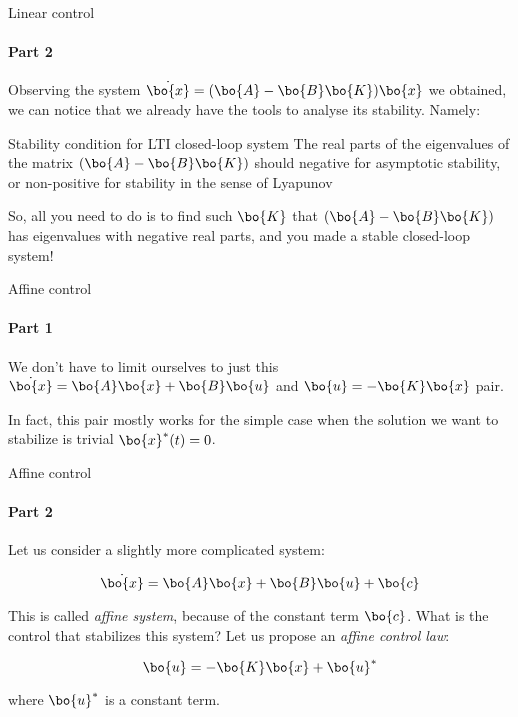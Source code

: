 \documentclass{beamer}
\begin{document}
\begin{frame}{Linear control}
\framesubtitle{Part 2}
\begin{flushleft}

Observing the system $\dot{\bo{x}} = (\bo{A} - \bo{B}\bo{K})\bo{x}$ we obtained, we can notice that we already have the tools to analyse its stability. Namely:

\begin{block}{Stability condition for LTI closed-loop system}
The real parts of the eigenvalues of the matrix $(\bo{A} - \bo{B}\bo{K})$ should negative for asymptotic stability, or non-positive for stability in the sense of Lyapunov
\end{block}


\bigskip

So, all you need to do is to find such $\bo{K}$ that $(\bo{A} - \bo{B}\bo{K})$ has eigenvalues with negative real parts, and you made a stable closed-loop system!

\end{flushleft}
\end{frame}




\begin{frame}{Affine control}
\framesubtitle{Part 1}
\begin{flushleft}

We don't have to limit ourselves to just this $\dot{\bo{x}} = \bo{A}\bo{x} + \bo{B}\bo{u}$ and $\bo{u} = -\bo{K}\bo{x}$ pair. 

\bigskip

In fact, this pair mostly works for the simple case when the solution we want to stabilize is trivial $\bo{x}^*(t) = 0$.


\end{flushleft}
\end{frame}



\begin{frame}{Affine control}
\framesubtitle{Part 2}
\begin{flushleft}

Let us consider a slightly more complicated system:

\begin{equation}
    \dot{\bo{x}} = \bo{A}\bo{x} + \bo{B}\bo{u} + \bo{c}
\end{equation}

This is called \emph{affine system}, because of the constant term $\bo{c}$. What is the control that stabilizes this system? Let us propose an \emph{affine control law}:

\begin{equation}
    \bo{u} = -\bo{K}\bo{x} + \bo{u}^*
\end{equation}

where $\bo{u}^*$ is a constant term.

\end{flushleft}
\end{frame}
\end{document}
